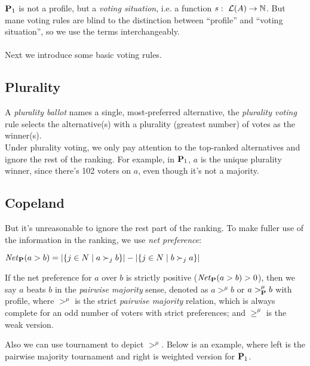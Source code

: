 $\mathbf{P}_1$ is not a profile, but a \textit{voting situation}, i.e. a function $s:\ \mathcal{L}(A) \to \mathbb{N}$. But mane voting rules are blind to the distinction between “profile” and “voting situation”, so we use the terms interchangeably.\\
~\\
Next we introduce some basic voting rules.

\subsection{Plurality}

A \textit{plurality ballot} names a single, most-preferred alternative, the \textit{plurality voting} rule selects the alternative(s) with a plurality (greatest number) of votes as the winner(s). \\
Under plurality voting, we only pay attention to the top-ranked alternatives and ignore the rest of the ranking. For example, in $\mathbf{P}_1$, $a$ is the unique plurality winner, since there's 102 voters on $a$, even though it's not a majority.

\subsection{Copeland}

But it's unreasonable to ignore the rest part of the ranking. To make fuller use of the information in the ranking, we use \textit{net preference}:
~\\
\begin{definition}
    $\mathit{Net}_{\mathbf{P}}(a>b) = |\{j \in N\;|\; a \succ_j b\}| - |\{j \in N\;|\; b \succ_j a\}|$
\end{definition}

If the net preference for $a$ over $b$ is strictly positive ($\mathit{Net}_{\mathbf{P}}(a>b) > 0$), then we say $a$ beats $b$ in the \textit{pairwise majority} sense, denoted as $a >^\mu b$ or $a >^\mu_{\mathbf{P}} b$ with profile, where $>^\mu$ is the strict \textit{pairwise majority} relation, which is always complete for an odd number of voters with strict preferences; and $\geq^\mu$ is the weak version.

Also we can use tournament to depict $>^\mu$. Below is an example, where left is the pairwise majority tournament and right is weighted version for $\mathbf{P}_1$.

\begin{center}
\end{center}

